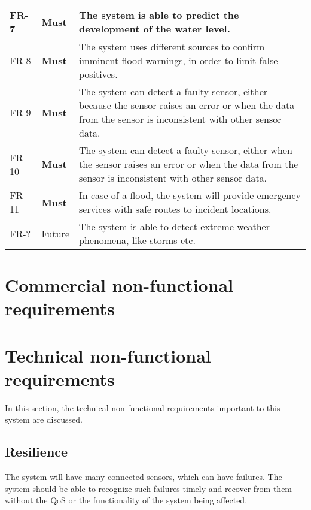 \begin{tabular}{p{} p{} p{}}
    \hline {} \label{fr:7} FR-7 & 
      \textbf{Must} &
      The system is able to predict the development of the water level. \\
	
    \hline {} \label{fr:8} FR-8 & 
      \textbf{Must} &
     The system uses different sources to confirm imminent flood warnings, in order to limit false positives. \\
	
    \hline {} \label{fr:9} FR-9 & 
      \textbf{Must} &
     The system can detect a faulty sensor, either because the sensor raises an error or when the data from the sensor is inconsistent with other sensor data. \\
	
    \hline {} \label{fr:10} FR-10 & 
      \textbf{Must} &
     The system can detect a faulty sensor, either when the sensor raises an error or when the data from the sensor is inconsistent with other sensor data. \\
    
	\hline {} \label{fr:11} FR-11 & 
      \textbf{Must} &
     In case of a flood, the system will provide emergency services with safe routes to incident locations. \\	
	
    \hline {} \label{fr:x} FR-? & 
      Future &
     The system is able to detect extreme weather phenomena, like storms etc. \\
\end{tabular}

\section{Commercial non-functional requirements}


\section{Technical non-functional requirements}
In this section, the technical non-functional requirements important to this system are discussed.

\subsection{Resilience}
The system will have many connected sensors, which can have failures. The system should be able to recognize such failures timely and recover from them without the QoS or the functionality of the system being affected. 

